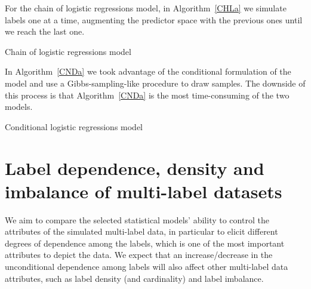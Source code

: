 \documentclass[review]{elsarticle}
\begin{document}
	For the chain of logistic regressions model, in Algorithm~\ref{CHLa} we simulate labels one at a time, augmenting the predictor space with the previous ones until we reach the last one.
	\begin{algorithm}[H]
		\caption{Chain of logistic regressions model}\label{CHLa}
		\begin{algorithmic}[1]
			\EndFor
		\end{algorithmic}
	\end{algorithm}
	
	In Algorithm~\ref{CNDa} we took advantage of the conditional formulation of the model and use a Gibbs-sampling-like procedure to draw samples. The downside of this process is that Algorithm~\ref{CNDa} is the most time-consuming of the two models.
	\begin{algorithm}[H]
		\caption{Conditional logistic regressions model}\label{CNDa}
		\begin{algorithmic}[1]
			\Repeat
		\end{algorithmic}
	\end{algorithm}
	
	
	\section{Label dependence, density and imbalance of multi-label datasets}\label{s:attributes}
	
	We aim to compare the selected statistical models' ability to control the attributes of the simulated multi-label data, in particular to elicit different degrees of dependence among the labels, which is one of the most important attributes to depict the data. We expect that an increase/decrease in the unconditional dependence among labels will also affect other multi-label data attributes, such as label density (and cardinality) and label imbalance.
	
\end{document}
